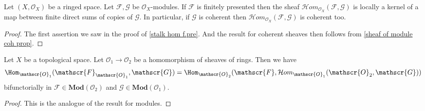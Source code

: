 \begin{proposition}
Let $(X,\mathscr{O}_X)$ be a ringed space. Let $\mathscr{F},\mathscr{G}$ be $\mathscr{O}_{X}$-modules. If $\mathscr{F}$ is finitely presented then the sheaf $\mathcal{H}om_{\mathscr{O}_X}(\mathscr{F},\mathscr{G})$ is locally a kernel of a map between finite direct sums of copies of $\mathscr{G}$. In particular, if $\mathscr{G}$ is coherent then $\mathcal{H}om_{\mathscr{O}_X}(\mathscr{F},\mathscr{G})$ is coherent too.
\end{proposition}
\begin{proof}
The first assertion we saw in the proof of \cref{stalk hom f.pre}. And the result for coherent sheaves then follows from \cref{sheaf of module coh prop}.
\end{proof}
\begin{proposition}
Let $X$ be a topological space. Let $\mathscr{O}_1\to\mathscr{O}_2$ be a homomorphism of sheaves of rings. Then we have
\[\Hom_{\mathscr{O}_1}(\mathscr{F}_{\mathscr{O}_1},\mathscr{G})=\Hom_{\mathscr{O}_2}(\mathscr{F},\mathcal{H}om_{\mathscr{O}_1}(\mathscr{O}_2,\mathscr{G}))\]
bifunctorially in $\mathscr{F}\in\mathbf{Mod}(\mathscr{O}_2)$ and $\mathscr{G}\in\mathbf{Mod}(\mathscr{O}_1)$.
\end{proposition}
\begin{proof}
This is the analogue of the result for modules.
\end{proof}
